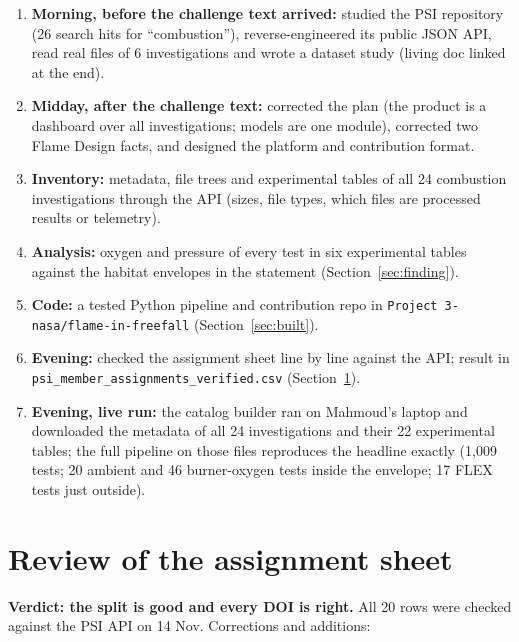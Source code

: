 \documentclass[10pt,a4paper]{article}
\newcommand{\file}[1]{\nolinkurl{#1}}
\begin{document}
\begin{enumerate}
\item \textbf{Morning, before the challenge text arrived:} studied the PSI repository (26 search hits for ``combustion''), reverse-engineered its public JSON API, read real files of 6 investigations and wrote a dataset study (living doc linked at the end).
\item \textbf{Midday, after the challenge text:} corrected the plan (the product is a dashboard over all investigations; models are one module), corrected two Flame Design facts, and designed the platform and contribution format.
\item \textbf{Inventory:} metadata, file trees and experimental tables of all 24 combustion investigations through the API (sizes, file types, which files are processed results or telemetry).
\item \textbf{Analysis:} oxygen and pressure of every test in six experimental tables against the habitat envelopes in the statement (Section~\ref{sec:finding}).
\item \textbf{Code:} a tested Python pipeline and contribution repo in \file{Project 3-nasa/flame-in-freefall} (Section~\ref{sec:built}).
\item \textbf{Evening:} checked the assignment sheet line by line against the API; result in \file{psi_member_assignments_verified.csv} (Section~\ref{sec:review}).
\item \textbf{Evening, live run:} the catalog builder ran on Mahmoud's laptop and downloaded the metadata of all 24 investigations and their 22 experimental tables; the full pipeline on those files reproduces the headline exactly (1,009 tests; 20 ambient and 46 burner-oxygen tests inside the envelope; 17 FLEX tests just outside).
\end{enumerate}

\section{Review of the assignment sheet}\label{sec:review}

\textbf{Verdict: the split is good and every DOI is right.} All 20 rows were checked against the PSI API on 14 Nov. Corrections and additions:
\end{document}
